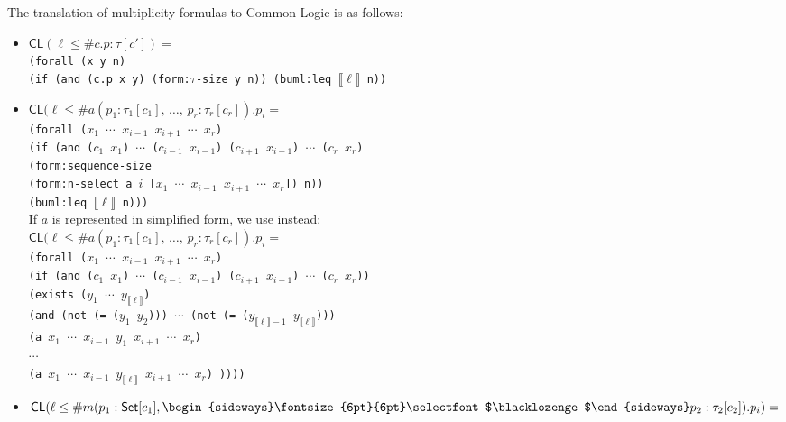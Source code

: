 \documentclass[10pt,fleqn,%
\ifpretendfinal
final%
\else
draft%
\fi,
]{scrreprt}
\newcommand*{\CL}{\ensuremath{\mathsf{CL}}\xspace}
\newcommand{\composition}{\raisebox{0.2pt}{\begin{sideways}\fontsize{6pt}{6pt}\selectfont$\blacklozenge$\end{sideways}}}
\newcommand{\sem}[1]{\mathopen\llbracket#1\mathclose\rrbracket}
\newcommand{\white}[1]{{\color{white}{#1}}}
\newcommand{\qqquad}{\white{x}\qquad}
\begin{document}
The translation of multiplicity formulas to Common Logic is as follows:
\begin{itemize}
  \item  $\CL(\ell \leq \mathsf{\#}c\mathsf{.}p \mathrel{\mathsf{:}} \tau[c']) =$\\
\texttt{(forall (x y n)}\\
\qqquad\texttt{(if (and (c.p x y) (form:$\tau$-size y n)) (buml:leq $\sem{\ell}$ n))}
  \item $\CL(\ell \leq \mathsf{\#}a(p_1 \mathrel{\mathsf{:}} \tau_1[c_1]\mathsf{,}\, \dots\mathsf{,}\, p_r \mathrel{\mathsf{:}} \tau_r[c_r])\mathsf{.}p_i=$\\
\texttt{(forall ($x_1$ $\cdots$ $x_{i-1}$ $x_{i+1}$ $\cdots$ $x_r$)}\\
\qqquad\texttt{(if (and ($c_1$ $x_1$) $\cdots$ ($c_{i-1}$ $x_{i-1}$) ($c_{i+1}$ $x_{i+1}$) $\cdots$ ($c_r$ $x_r$)\\
\qqquad\qqquad\qqquad  (form:sequence-size \\
\qqquad\qqquad\qqquad\qqquad(form:n-select a $i$ [$x_1$ $\cdots$ $x_{i-1}$ $x_{i+1}$ $\cdots$ $x_r$]) n))\\
\qqquad\qqquad (buml:leq $\sem{\ell}$ n)))}\\
If $a$ is represented in simplified form, we use instead:\\
$\CL(\ell \leq \mathsf{\#}a(p_1 \mathrel{\mathsf{:}} \tau_1[c_1]\mathsf{,}\, \dots\mathsf{,}\, p_r \mathrel{\mathsf{:}} \tau_r[c_r])\mathsf{.}p_i=$\\
\texttt{(forall ($x_1$ $\cdots$ $x_{i-1}$ $x_{i+1}$ $\cdots$ $x_r$)\\
\qqquad(if (and ($c_1$ $x_1$) $\cdots$ ($c_{i-1}$ $x_{i-1}$) ($c_{i+1}$ $x_{i+1}$) $\cdots$ ($c_r$ $x_r$))\\
\qqquad\qqquad\qquad  (exists ($y_1$ $\cdots$ $y_{\sem{\ell}}$)\\
\qqquad\qqquad\qquad\qquad (and (not (= ($y_1$ $y_2$))) $\cdots$  (not (= ($y_{\sem{\ell}-1}$ $y_{\sem{\ell}}$))) \\
\qqquad\qqquad\qqquad\qqquad\qquad(a $x_1$ $\cdots$ $x_{i-1}$ $y_1$ $x_{i+1}$ $\cdots$ $x_r$)\\
\qqquad\qqquad\qqquad\qqquad\qquad$\cdots$\\
\qqquad\qqquad\qqquad\qqquad\qquad(a $x_1$ $\cdots$ $x_{i-1}$ $y_{\sem{\ell}}$ $x_{i+1}$ $\cdots$ $x_r$) ))))}
  \item  $\CL(\ell \leq \mathsf{\#}m(p_1 \mathrel{\mathsf{:}} \mathsf{Set}[c_1]\mathsf{,}\, \composition p_2 \mathrel{\mathsf{:}} \tau_2[c_2])\mathsf{.}p_i)=$\\

\end{itemize}
\end{document}
